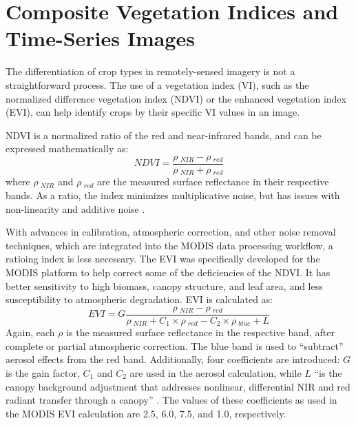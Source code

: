 \section{Composite Vegetation Indices and Time-Series Images}

The differentiation of crop types in remotely-sensed imagery is not a straightforward process. The use of a vegetation index (VI), such as the normalized difference vegetation index (NDVI) or the enhanced vegetation index (EVI), can help identify crops by their specific VI values in an image.

NDVI is a normalized ratio of the red and near-infrared bands, and can be expressed mathematically as:
\begin{equation}
  NDVI = \frac{\rho~_{NIR} - \rho~_{red}}{\rho~_{NIR} + \rho~_{red}}
\end{equation}
where $\rho~_{NIR}$ and $\rho~_{red}$ are the measured surface reflectance in their respective bands. As a ratio, the index minimizes multiplicative noise, but has issues with non-linearity and additive noise \autocite{huete2002overview}.

With advances in calibration, atmospheric correction, and other noise removal techniques, which are integrated into the MODIS data processing workflow, a ratioing index is less necessary. The EVI was specifically developed for the MODIS platform to help correct some of the deficiencies of the NDVI. It has better sensitivity to high biomass, canopy structure, and leaf area, and less susceptibility to atmospheric degradation. EVI is calculated as:
\begin{equation}
  EVI = G\frac{\rho~_{NIR} - \rho~_{red}}{\rho~_{NIR} +  C_1\times\rho~_{red} - C_2 \times \rho~_{blue} + L}
\end{equation}
Again, each $\rho$ is the measured surface reflectance in the respective band, after complete or partial atmospheric correction. The blue band is used to ``subtract'' aerosol effects from the red band. Additionally, four coefficients are introduced: $G$ is the gain factor, $C_1$ and $C_2$ are used in the aerosol calculation, while $L$ ``is the canopy background adjustment that addresses nonlinear, differential NIR and red radiant transfer through a canopy'' \citereset\autocite[196]{huete2002overview}. The values of these coefficients as used in the MODIS EVI calculation are 2.5, 6.0, 7.5, and 1.0, respectively.

